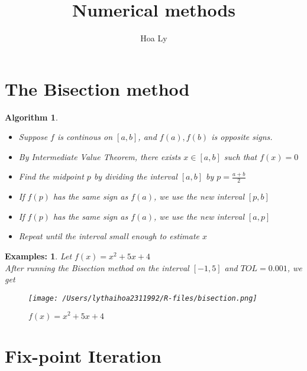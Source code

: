 \documentclass[12pt]{article}
\title{Numerical methods }
\author{Hoa Ly}
\newtheorem{alg}[theorem]{Algorithm}
\newtheorem*{ex}{Examples:}
\begin{document}
\maketitle
{}
\tableofcontents
\newpage

\section{The Bisection method}
\begin{alg}
\begin{itemize}
	\item Suppose $f$ is continous on $[a,b]$, and $f(a),f(b)$ is opposite signs.
	\item By Intermediate Value Theorem, there exists $x \in [a,b]$ such that $f(x) = 0$
	\item Find the midpoint $p$ by dividing the interval $[a,b]$ by $p = \frac{a+b}{2}$
	\item If $f(p)$ has the same sign as $f(a)$, we use the new interval $[p,b]$
	\item If $f(p)$ has the same sign as $f(a)$, we use the new interval $[a,p]$
	\item Repeat until the interval small enough to estimate $x$
	
\end{itemize}
\end{alg}
\begin{ex}
Let $f(x) = x^2 + 5x +4$ \\
After running the Bisection method on the interval $[-1,5]$ and $TOL = 0.001$, we get 	\\
\begin{figure}[H]
\centering 
\texttt{[image: /Users/lythaihoa2311992/R-files/bisection.png]}
\caption{$f(x) = x^2 +5x +4$}	
\end{figure}	
\end{ex}


\section{Fix-point Iteration}
\end{document}
